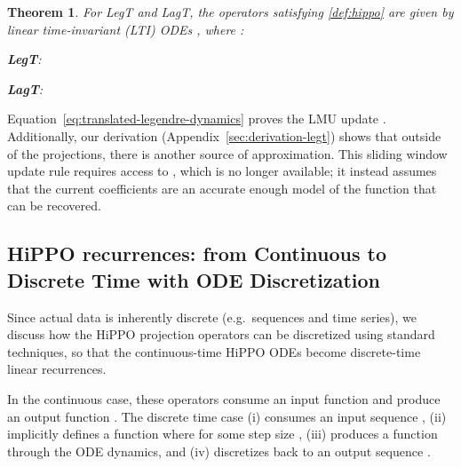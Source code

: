 \documentclass{article}
\newtheorem{theorem}{Theorem}
\begin{document}
\begin{theorem}
  \label{thm:legt-lagt}
  For LegT and LagT, the  operators satisfying \cref{def:hippo} are given by linear time-invariant (LTI) ODEs , where :

  \small
  \begin{minipage}{.60\linewidth}
    \textnormal{\textbf{LegT}:}
    \vspace{-1em}
    
  \end{minipage}\hfill \begin{minipage}{.35\linewidth}
    \textnormal{\textbf{LagT}:}
    \vspace{-1em}
    
  \end{minipage}

\end{theorem}





Equation~\eqref{eq:translated-legendre-dynamics} proves the LMU update \citep[equation (1)]{voelker2019legendre}.
Additionally, our derivation (Appendix~\ref{sec:derivation-legt}) shows that outside of the projections,
there is another source of approximation.
This sliding window update rule requires access to , which is no longer available;
it instead assumes that the current coefficients  are an accurate enough model of the function  that  can be recovered.





\subsection{HiPPO recurrences: from Continuous to Discrete Time with ODE Discretization}
\label{sec:discretization}

Since actual data is inherently discrete (e.g.\ sequences and time series),
we discuss how the HiPPO projection operators can be discretized using standard techniques,
so that the continuous-time HiPPO ODEs become discrete-time linear recurrences.





In the continuous case, these operators consume an input function  and produce an output function .
The discrete time case (i) consumes an input sequence , (ii) implicitly defines a function  where  for some step
size , (iii) produces a function  through the ODE dynamics,
and (iv) discretizes back to an output sequence .
\end{document}
